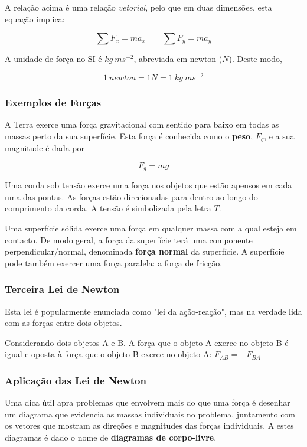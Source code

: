 A relação acima é uma relação \emph{vetorial}, pelo que em duas dimensões, esta equação implica:

\begin{equation}\label{eqn:2newton}
    \sum F_x=ma_x \qquad \sum F_y=ma_y
\end{equation}

A unidade de força no SI é $kg\ ms^{-2}$, abreviada em newton ($N$). Deste modo,

\begin{equation*}
    1\ newton = 1 N = 1\ kg\ ms^{-2}
\end{equation*}

\subsubsection{Exemplos de Forças}
A Terra exerce uma força gravitacional com sentido para baixo em todas as massas perto da sua superfície. Esta força é conhecida como o \textbf{peso}, $F_g$, e a sua magnitude é dada por

\begin{equation}
    F_g=mg    
\end{equation}

Uma corda sob tensão exerce uma força nos objetos que estão apensos em cada uma das pontas. As forças estão direcionadas para dentro ao longo do comprimento da corda. A tensão é simbolizada pela letra $T$.

Uma superfície sólida exerce uma força em qualquer massa com a qual esteja em contacto. De modo geral, a força da superfície terá uma componente perpendicular/normal, denominada \textbf{força normal} da superfície. A superfície pode também exercer uma força paralela: a força de fricção.

\subsubsection{Terceira Lei de Newton}
Esta lei é popularmente enunciada como "lei da ação-reação", mas na verdade lida com as forças entre dois objetos.

\begin{definition} Considerando dois objetos A e B. A força que o objeto A exerce no objeto B é igual e oposta à força que o objeto B exerce no objeto A: $F_{AB}=-F_{BA}$
\end{definition}

\subsubsection{Aplicação das Lei de Newton}
Uma dica útil apra problemas que envolvem mais do que uma força é desenhar um diagrama que evidencia as massas individuais no problema, juntamento com os vetores que mostram as direções e magnitudes das forças individuais. A estes diagramas é dado o nome de \textbf{diagramas de corpo-livre}.

